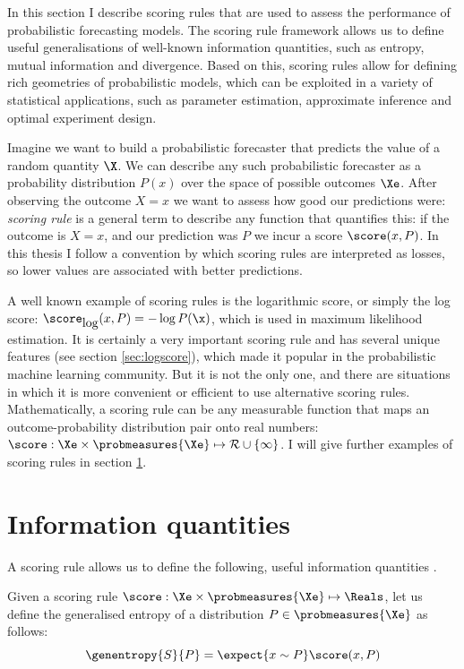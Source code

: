 In this section I describe scoring rules that are used to assess the performance of probabilistic forecasting models. The scoring rule framework allows us to define useful generalisations of well-known information quantities, such as entropy, mutual information and divergence. Based on this, scoring rules allow for defining rich geometries of probabilistic models, which can be exploited in a variety of statistical applications, such as parameter estimation, approximate inference and optimal experiment design.

Imagine we want to build a probabilistic forecaster that predicts the value of a random quantity $\X$. We can describe any such probabilistic forecaster as a probability distribution $P(x)$ over the space of possible outcomes $\Xe$. After observing the outcome $X=x$ we want to assess how good our predictions were: \emph{scoring rule} is a general term to describe any function that quantifies this: if the outcome is $X=x$, and our prediction was $P$ we incur a score $\score (x,P)$. In this thesis I follow a convention by which scoring rules are interpreted as losses, so lower values are associated with better predictions.

A well known example of scoring rules is the logarithmic score, or simply the log score: $\score_{\mbox{log}}(x,P) = -\log P(\x)$, which is used in maximum likelihood estimation. It is certainly a very important scoring rule and has several unique features (see section \ref{sec:logscore}), which made it popular in the probabilistic machine learning community. But it is not the only one, and there are situations in which it is more convenient or efficient to use alternative scoring rules.  Mathematically, a scoring rule can be any measurable function that maps an outcome-probability distribution pair onto real numbers: $\score:\Xe\times\probmeasures{\Xe}\mapsto\mathcal{R}\cup\{\infty\}$. I will give further examples of scoring rules in section \ref{}.

\section{Information quantities}

A scoring rule allows us to define the following, useful information quantities \cite[see also][]{Blaetal2332}.

\begin{definition}
Given a scoring rule $\score:\Xe\times\probmeasures{\Xe}\mapsto\Reals$, let us define the generalised entropy of a distribution $P\in\probmeasures{\Xe}$ as follows:
\begin{equation}
	\genentropy{S}{P}= \expect{x\sim P} \score(x,P)
\end{equation}
\end{definition}


